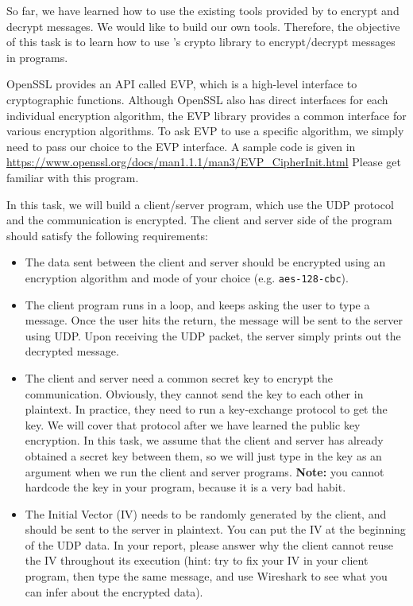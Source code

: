 \noindent
So far, we have learned how to use the existing tools provided by
\openssl to encrypt and decrypt messages. We would like to build our own
tools. Therefore,  the objective of this task
is to learn how to use \openssl's  crypto library to encrypt/decrypt
messages in programs.


OpenSSL provides an API called EVP, which
is a high-level interface to cryptographic functions.
Although OpenSSL also has direct interfaces for each individual
encryption algorithm, the EVP library provides
a common interface for various encryption algorithms.
To ask EVP to use a specific algorithm, we simply need to
pass our choice to the EVP interface.
A sample code is given in
\url{https://www.openssl.org/docs/man1.1.1/man3/EVP_CipherInit.html}
Please get familiar with this program.


In this task, we will build a client/server program, which use the UDP protocol and
the communication is encrypted. The client and server side of the program should
satisfy the following requirements:

\begin{itemize}
  \item The data sent between the client and server should be encrypted using
    an encryption algorithm and mode of your choice (e.g. \texttt{aes-128-cbc}).

  \item The client program runs in a loop, and keeps asking the user to type a message.
    Once the user hits the return, the message will be sent to the server using UDP.
    Upon receiving the UDP packet, the server simply prints out the decrypted message.

  \item The client and server need a common secret key to encrypt the communication.
    Obviously, they cannot send the key to each other in plaintext. In practice, they
    need to run a key-exchange protocol to get the key. We will cover that protocol
    after we have learned the public key encryption. In this task, we assume that the client
    and server has already obtained a secret key between them, so we will just
    type in the key as an argument when we run the client and server programs.
    {\bf Note:} you cannot hardcode the key in your program, because it is a very bad habit.

  \item The Initial Vector (IV) needs to be randomly generated by the client,
    and should be sent to the server in plaintext. You can put the IV at the beginning of the
    UDP data. In your report, please answer why the client cannot reuse the IV throughout its
    execution (hint: try to fix your IV in your client program, then type the same message, and
    use Wireshark to see what you can infer about the encrypted data).
\end{itemize}


